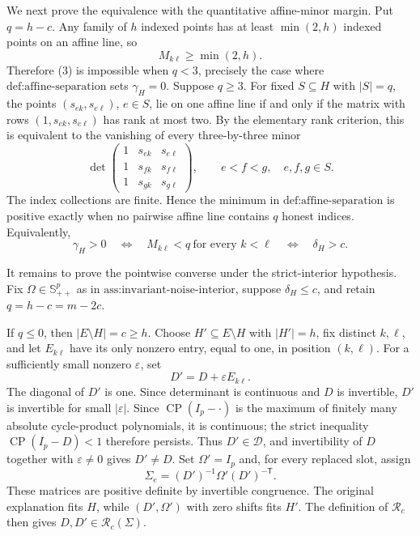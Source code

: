 We next prove the equivalence with the quantitative affine-minor margin.  Put \(q=h-c\).  Any family of \(h\) indexed points has at least \(\min(2,h)\) indexed points on an affine line, so
\[
 M_{k\ell}\ge \min(2,h). \tag{5}
\]
Therefore (3) is impossible when \(q<3\), precisely the case where \(\text{def:affine-separation}\) sets \(\gamma_H=0\).  Suppose \(q\ge3\).  For fixed \(S\subseteq H\) with \(|S|=q\), the points \((s_{ek},s_{e\ell})\), \(e\in S\), lie on one affine line if and only if the matrix with rows \((1,s_{ek},s_{e\ell})\) has rank at most two.  By the elementary rank criterion, this is equivalent to the vanishing of every three-by-three minor
\[
 \det\!\begin{pmatrix}
 1&s_{ek}&s_{e\ell}\\
 1&s_{fk}&s_{f\ell}\\
 1&s_{gk}&s_{g\ell}
 \end{pmatrix},
 \qquad e<f<g,\quad e,f,g\in S. \tag{6}
\]
The index collections are finite.  Hence the minimum in \(\text{def:affine-separation}\) is positive exactly when no pairwise affine line contains \(q\) honest indices.  Equivalently,
\[
 \gamma_H>0
 \quad\Longleftrightarrow\quad
 M_{k\ell}<q\ \text{for every }k<\ell
 \quad\Longleftrightarrow\quad
 \delta_H>c. \tag{7}
\]

It remains to prove the pointwise converse under the strict-interior hypothesis.  Fix \(\Omega\in\mathbb S_{++}^p\) as in \(\text{ass:invariant-noise-interior}\), suppose \(\delta_H\le c\), and retain \(q=h-c=m-2c\).

If \(q\le0\), then \(|E\setminus H|=c\ge h\).  Choose \(H'\subseteq E\setminus H\) with \(|H'|=h\), fix distinct \(k,\ell\), and let \(E_{k\ell}\) have its only nonzero entry, equal to one, in position \((k,\ell)\).  For a sufficiently small nonzero \(\varepsilon\), set
\[
 D'=D+\varepsilon E_{k\ell}. \tag{8}
\]
The diagonal of \(D'\) is one.  Since determinant is continuous and \(D\) is invertible, \(D'\) is invertible for small \(|\varepsilon|\).  Since \(\operatorname{CP}(I_p-\cdot)\) is the maximum of finitely many absolute cycle-product polynomials, it is continuous; the strict inequality \(\operatorname{CP}(I_p-D)<1\) therefore persists.  Thus \(D'\in\mathcal D\), and invertibility of \(D\) together with \(\varepsilon\ne0\) gives \(D'\ne D\).  Set \(\Omega'=I_p\) and, for every replaced slot, assign
\[
 \Sigma_e=(D')^{-1}\Omega'(D')^{-\mathsf T}. \tag{9}
\]
These matrices are positive definite by invertible congruence.  The original explanation fits \(H\), while \((D',\Omega')\) with zero shifts fits \(H'\).  The definition of \(\mathcal R_c\) then gives \(D,D'\in\mathcal R_c(\Sigma)\).

